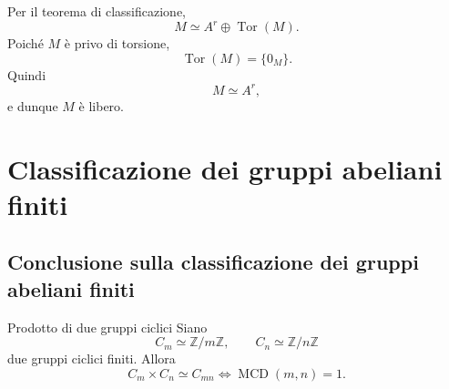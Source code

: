 \documentclass[a4paper]{article}
\begin{document}
\begin{radioactive}
\begin{snippetproof}{}
    Per il teorema di classificazione,
    \[
        M\simeq A^r\oplus \operatorname{Tor}(M).
    \]
    Poiché \(M\) è privo di torsione,
    \[
        \operatorname{Tor}(M)=\{0_M\}.
    \]
    Quindi
    \[
        M\simeq A^r,
    \]
    e dunque \(M\) è libero.
\end{snippetproof}
\end{radioactive}

\section{Classificazione dei gruppi abeliani finiti}

\subsection{Conclusione sulla classificazione dei gruppi abeliani finiti}

\begin{radioactive}
\begin{snippetcorollary}{Prodotto di due gruppi ciclici}
    Siano
    \[
        C_m\simeq \mathbb{Z}/m\mathbb{Z},
        \qquad
        C_n\simeq \mathbb{Z}/n\mathbb{Z}
    \]
    due gruppi ciclici finiti. Allora
    \[
        C_m\times C_n\simeq C_{mn}
        \iff
        \operatorname{MCD}(m,n)=1.
    \]
\end{snippetcorollary}
\end{radioactive}
\end{document}
